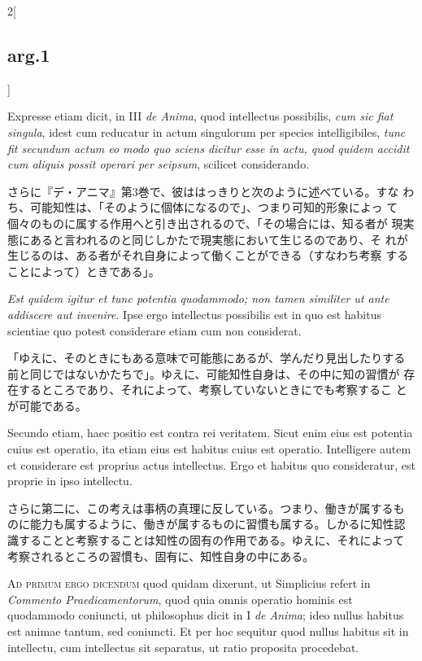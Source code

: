 \documentclass[paper=a4paper,fontsize=10pt,jafontsize=9pt,titlepage]{jlreq}
\begin{document}
\begin{paracol}{2}[\subsection{arg.1}]
\switchcolumn*

Expresse etiam dicit, in III {\itshape de Anima}, quod intellectus possibilis,
{\itshape cum sic fiat singula}, idest cum reducatur in actum singulorum per
species intelligibiles, {\itshape tunc fit secundum actum eo modo quo sciens
dicitur esse in actu, quod quidem accidit cum aliquis possit operari
per seipsum}, scilicet considerando.

\switchcolumn

さらに『デ・アニマ』第3巻で、彼ははっきりと次のように述べている。すな
わち、可能知性は、「そのように個体になるので」、つまり可知的形象によっ
て個々のものに属する作用へと引き出されるので、「その場合には、知る者が
現実態にあると言われるのと同じしかたで現実態において生じるのであり、そ
れが生じるのは、ある者がそれ自身によって働くことができる（すなわち考察
することによって）ときである」。

\switchcolumn*

{\itshape Est quidem igitur et tunc potentia quodammodo; non tamen
similiter ut ante addiscere aut invenire}. Ipse ergo intellectus
possibilis est in quo est habitus scientiae quo potest considerare
etiam cum non considerat.

\switchcolumn

「ゆえに、そのときにもある意味で可能態にあるが、学んだり見出したりする
前と同じではないかたちで」。ゆえに、可能知性自身は、その中に知の習慣が
存在するところであり、それによって、考察していないときにでも考察するこ
とが可能である。

\switchcolumn*

Secundo etiam, haec positio est contra rei veritatem. Sicut enim eius
est potentia cuius est operatio, ita etiam eius est habitus cuius est
operatio. Intelligere autem et considerare est proprius actus
intellectus. Ergo et habitus quo consideratur, est proprie in ipso
intellectu.

\switchcolumn

さらに第二に、この考えは事柄の真理に反している。つまり、働きが属するも
のに能力も属するように、働きが属するものに習慣も属する。しかるに知性認
識することと考察することは知性の固有の作用である。ゆえに、それによって
考察されるところの習慣も、固有に、知性自身の中にある。

\switchcolumn*[\subsection{ad.1}]

{\scshape Ad primum ergo dicendum} quod quidam dixerunt, ut Simplicius refert in
 {\itshape Commento Praedicamentorum}, quod quia omnis operatio hominis est
 quodammodo coniuncti, ut philosophus dicit in I {\itshape de Anima}; ideo nullus
 habitus est animae tantum, sed coniuncti. Et per hoc sequitur quod
 nullus habitus sit in intellectu, cum intellectus sit separatus, ut
 ratio proposita procedebat.


\end{paracol}
\end{document}
